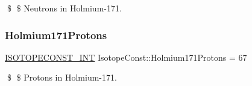 \$ \$ Neutrons in Holmium-\/171. \mbox{\label{group___isotope_const-_holmium-_ho171_ga7400565726ec8bcfe68e3e3a3521666c}} 
\subsubsection{\texorpdfstring{Holmium171\+Protons}{Holmium171Protons}}
{\footnotesize\ttfamily \mbox{\hyperlink{group___isotope_const-_macros_ga5f18360b3e99483a35c32d789e62621c}{I\+S\+O\+T\+O\+P\+E\+C\+O\+N\+S\+T\+\_\+\+I\+NT}} Isotope\+Const\+::\+Holmium171\+Protons = 67}

\$ \$ Protons in Holmium-\/171. 